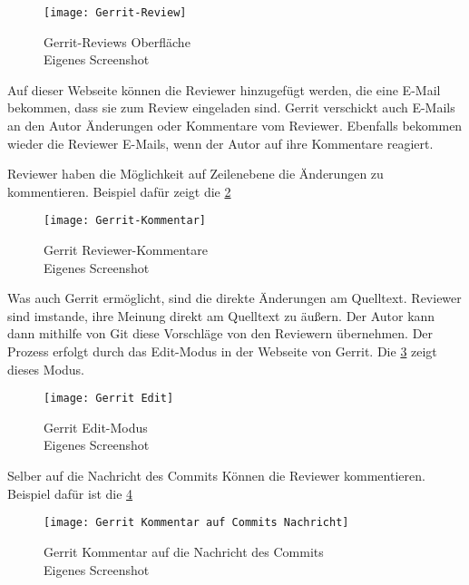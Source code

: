 \begin{figure}[H]
	\centering
	\texttt{[image: Gerrit-Review]}
	\caption[Gerrit Reviews Oberfläche]{Gerrit-Reviews Oberfläche\\Eigenes Screenshot}
	\label{fig:Gerrit-Review}
\end{figure}

Auf dieser Webseite können die Reviewer hinzugefügt werden, die eine E-Mail bekommen, dass sie zum Review eingeladen sind. Gerrit verschickt auch E-Mails an den Autor Änderungen oder Kommentare vom Reviewer. Ebenfalls bekommen wieder die Reviewer E-Mails, wenn der Autor auf ihre Kommentare reagiert.

Reviewer haben die Möglichkeit auf Zeilenebene die Änderungen zu kommentieren. Beispiel dafür zeigt die \cref{fig:Gerrit Reviewer-Kommentare} 

\begin{figure}[H]
	\centering
	\texttt{[image: Gerrit-Kommentar]}
	\caption[Gerrit Reviewer-Kommentare]{Gerrit Reviewer-Kommentare\\Eigenes Screenshot}
	\label{fig:Gerrit Reviewer-Kommentare}
\end{figure}

Was auch Gerrit ermöglicht, sind die direkte Änderungen am Quelltext. Reviewer sind imstande, ihre Meinung direkt am Quelltext zu äußern. Der Autor kann dann mithilfe von Git diese Vorschläge von den Reviewern übernehmen. Der Prozess erfolgt durch das Edit-Modus in der Webseite von Gerrit. Die \cref{fig:Gerrit Edit-Modus} zeigt dieses Modus.

\begin{figure}[H]
	\centering
	\texttt{[image: Gerrit Edit]}
	\caption[Gerrit Edit-Modus]{Gerrit Edit-Modus\\Eigenes Screenshot}
	\label{fig:Gerrit Edit-Modus}
\end{figure}

Selber auf die Nachricht des Commits Können die Reviewer kommentieren. Beispiel dafür ist die \cref{fig:Gerrit Kommentar auf Commits Nachricht}

\begin{figure}[H]
	\centering
	\texttt{[image: Gerrit Kommentar auf Commits Nachricht]}
	\caption[Gerrit Kommentar auf die Nachricht des Commits]{Gerrit Kommentar auf die Nachricht des Commits\\Eigenes Screenshot}
	\label{fig:Gerrit Kommentar auf Commits Nachricht}
\end{figure}

